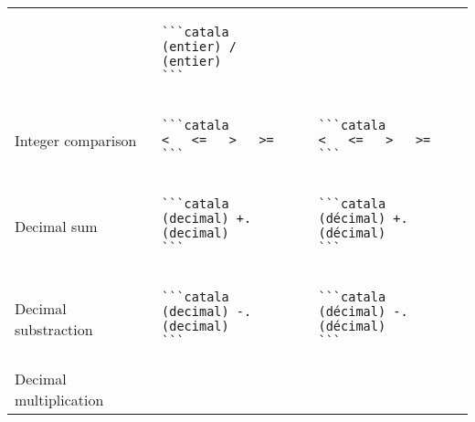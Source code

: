 \documentclass[a3paper,landscape]{article}
\begin{document}
\begin{multicols*}{2}
\begin{center}
\begin{tabular}{p{}p{}p{}}
                                      &
      \vspace*{-1.75em}
      \begin{verbatim}
```catala
(entier) / (entier)
```
\end{verbatim}
      \vspace*{-1.75em}
      \\
      Integer comparison              &
      \vspace*{-1.75em}
      \begin{verbatim}
```catala
<   <=   >   >=
```
\end{verbatim}
      \vspace*{-1.75em}
                                      &
      \vspace*{-1.75em}
      \begin{verbatim}
```catala
<   <=   >   >=
```
\end{verbatim}
      \vspace*{-1.75em}
      \\
      Decimal sum                     &
      \vspace*{-1.75em}
      \begin{verbatim}
```catala
(decimal) +. (decimal)
```
\end{verbatim}
      \vspace*{-1.75em}
                                      &
      \vspace*{-1.75em}
      \begin{verbatim}
```catala
(décimal) +. (décimal)
```
\end{verbatim}
      \vspace*{-1.75em}
      \\
      Decimal substraction            &
      \vspace*{-1.75em}
      \begin{verbatim}
```catala
(decimal) -. (decimal)
```
\end{verbatim}
      \vspace*{-1.75em}
                                      &
      \vspace*{-1.75em}
      \begin{verbatim}
```catala
(décimal) -. (décimal)
```
\end{verbatim}
      \vspace*{-1.75em}
      \\
      Decimal multiplication          &
      \vspace*{-1.75em}
      \begin{verbatim}

\end{verbatim}
\end{tabular}
\end{center}
\end{multicols*}
\end{document}
